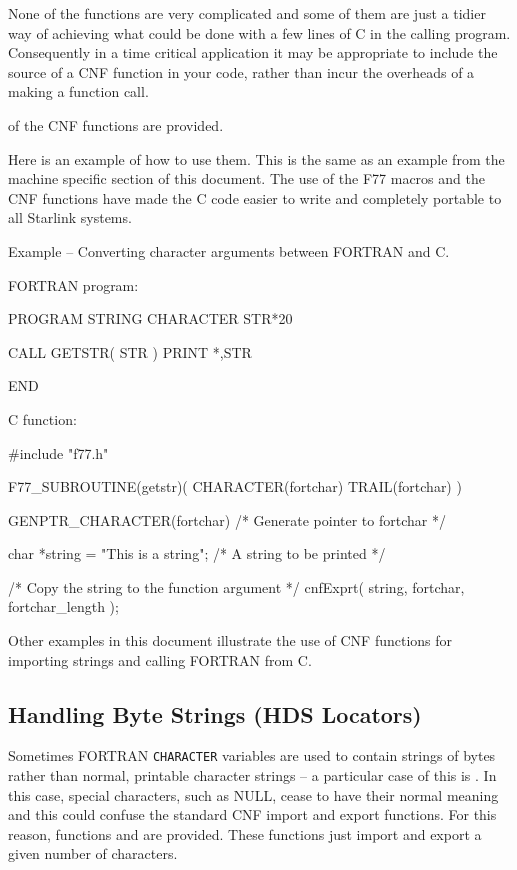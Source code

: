\documentclass[twoside,11pt,nolof]{starlink}
\newcounter{examples}
\begin{document}
None of the functions are very complicated and some of them are just a tidier
way of achieving what could be done with a few lines of C in the calling
program. Consequently in a time critical application it may be appropriate to
include the source of a CNF function in your code, rather than incur the
overheads of a making a function call.

of the CNF functions are
provided.

Here is an
example of how to use them. This is the same as an example from the machine
specific section of this document. The use of the F77 macros and the CNF
functions have made the C code easier to write and completely portable to all
Starlink systems.

\label{f77_char}
\begin{center}
Example\latex{~\ref{f77_char}}
-- Converting character arguments between FORTRAN and C\@.
\end{center}
\nopagebreak[4]
FORTRAN program:
\nopagebreak[4]
\begin{small}
\begin{terminalv}
      PROGRAM STRING
      CHARACTER STR*20

      CALL GETSTR( STR )
      PRINT *,STR

      END
\end{terminalv}
\end{small}
\pagebreak[1]
C function:
\nopagebreak[4]
\begin{small}
\begin{terminalv}
#include "f77.h"

F77_SUBROUTINE(getstr)( CHARACTER(fortchar) TRAIL(fortchar) )
{
  GENPTR_CHARACTER(fortchar)           /* Generate pointer to fortchar */

  char  *string = "This is a string";  /* A string to be printed */

/* Copy the string to the function argument */
  cnfExprt( string, fortchar, fortchar_length );
}
\end{terminalv}
\end{small}
Other examples in this document illustrate the use of CNF functions for
importing strings and calling FORTRAN from C.

\subsection{\label{locators}Handling Byte Strings (HDS Locators)}
Sometimes FORTRAN \texttt{CHARACTER} variables are used to contain strings of
bytes rather than normal, printable character strings -- a particular case
of this is
.
In this case, special characters, such as NULL, cease to have their normal
meaning and this could confuse the standard CNF import and export functions.
For this reason, functions
and
are provided.
These functions just import and export a given number of characters.
\end{document}
